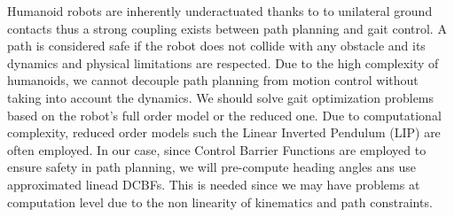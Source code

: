 Humanoid robots are inherently underactuated thanks to to unilateral ground contacts thus a strong coupling exists between path planning and gait control. A path is considered safe if the robot does not collide with any obstacle and its dynamics and physical limitations are respected.
Due to the high complexity of humanoids, we cannot decouple path planning from motion control without taking into account the dynamics. We should solve gait optimization problems based on the robot's full order model or the reduced one. Due to computational complexity, reduced order models such the Linear Inverted Pendulum (LIP) are often employed. In our case, since Control Barrier Functions are employed to ensure safety in path planning, we will pre-compute heading angles ans use approximated linead DCBFs.
This is needed since we may have problems at computation level due to the non linearity of kinematics and path constraints.
